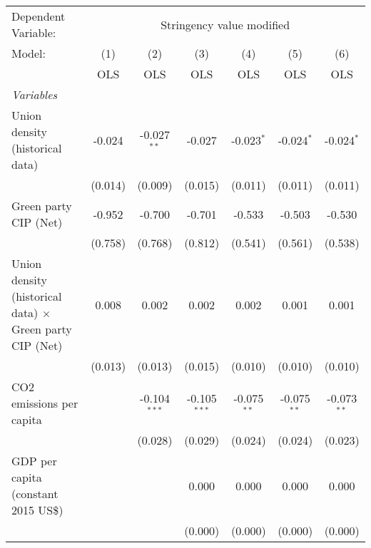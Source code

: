 
\begingroup
\centering
\begin{tabular}{lcccccc}
   \toprule
   Dependent Variable: & \multicolumn{6}{c}{Stringency value modified}\\
   Model:                                                          & (1)     & (2)            & (3)            & (4)           & (5)           & (6)\\  
                                                                   &  OLS    & OLS            & OLS            & OLS           & OLS           & OLS\\  
   \midrule
   \emph{Variables}\\
   Union density (historical data)                                 & -0.024  & -0.027$^{**}$  & -0.027         & -0.023$^{*}$  & -0.024$^{*}$  & -0.024$^{*}$\\   
                                                                   & (0.014) & (0.009)        & (0.015)        & (0.011)       & (0.011)       & (0.011)\\   
   Green party CIP (Net)                                           & -0.952  & -0.700         & -0.701         & -0.533        & -0.503        & -0.530\\   
                                                                   & (0.758) & (0.768)        & (0.812)        & (0.541)       & (0.561)       & (0.538)\\   
   Union density (historical data) $\times$ Green party CIP (Net)  & 0.008   & 0.002          & 0.002          & 0.002         & 0.001         & 0.001\\   
                                                                   & (0.013) & (0.013)        & (0.015)        & (0.010)       & (0.010)       & (0.010)\\   
   CO2 emissions per capita                                        &         & -0.104$^{***}$ & -0.105$^{***}$ & -0.075$^{**}$ & -0.075$^{**}$ & -0.073$^{**}$\\   
                                                                   &         & (0.028)        & (0.029)        & (0.024)       & (0.024)       & (0.023)\\   
   GDP per capita (constant 2015 US\$)                             &         &                & 0.000          & 0.000         & 0.000         & 0.000\\   
                                                                   &         &                & (0.000)        & (0.000)       & (0.000)       & (0.000)\\   

\end{tabular}
